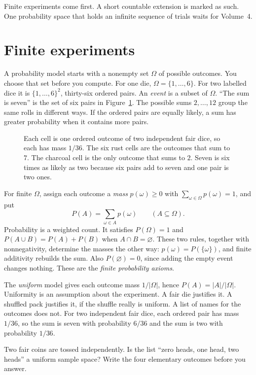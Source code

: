 Finite experiments come first. A short countable extension is marked as such. One probability space that holds an infinite sequence of trials waits for Volume~4.

\section{Finite experiments}

A probability model starts with a nonempty set $\Omega$ of possible outcomes. You choose that set before you compute. For one die, $\Omega=\{1,\ldots,6\}$. For two labelled dice it is $\{1,\ldots,6\}^2$, thirty-six ordered pairs. An \emph{event} is a subset of $\Omega$. ``The sum is seven'' is the set of six pairs in Figure~\ref{fig:dice}. The possible sums $2,\ldots,12$ group the same rolls in different ways. If the ordered pairs are equally likely, a sum has greater probability when it contains more pairs.

\begin{figure}[ht]
\centering
{}
\caption{Each cell is one ordered outcome of two independent fair dice, so each has mass $1/36$. The six rust cells are the outcomes that sum to $7$. The charcoal cell is the only outcome that sums to $2$. Seven is six times as likely as two because six pairs add to seven and one pair is two ones.}
\label{fig:dice}
\end{figure}

For finite $\Omega$, assign each outcome a \emph{mass} $p(\omega)\ge0$ with $\sum_{\omega\in\Omega}p(\omega)=1$, and put
\[
 P(A)=\sum_{\omega\in A}p(\omega)\qquad(A\subseteq\Omega).
\]
Probability is a weighted count. It satisfies $P(\Omega)=1$ and $P(A\cup B)=P(A)+P(B)$ when $A\cap B=\varnothing$. These two rules, together with nonnegativity, determine the masses the other way: $p(\omega)=P(\{\omega\})$, and finite additivity rebuilds the sum. Also $P(\varnothing)=0$, since adding the empty event changes nothing. These are the \emph{finite probability axioms}.

The \emph{uniform} model gives each outcome mass $1/|\Omega|$, hence $P(A)=|A|/|\Omega|$. Uniformity is an assumption about the experiment. A fair die justifies it. A shuffled pack justifies it, if the shuffle really is uniform. A list of names for the outcomes does not. For two independent fair dice, each ordered pair has mass $1/36$, so the sum is seven with probability $6/36$ and the sum is two with probability $1/36$.

\begin{think}
Two fair coins are tossed independently. Is the list ``zero heads, one head, two heads'' a uniform sample space? Write the four elementary outcomes before you answer.
\end{think}

